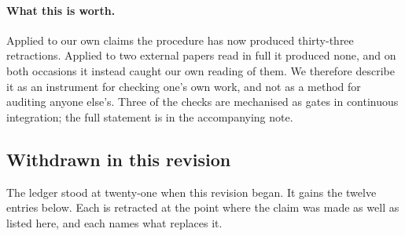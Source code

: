 \documentclass[11pt]{article}
\theoremstyle{definition}
\begin{document}
\paragraph{What this is worth.} Applied to our own claims the procedure has now
produced thirty-three retractions. Applied to two external papers read in full it
produced none, and on both occasions it instead caught our own reading of them.
We therefore describe it as an instrument for checking one's own work, and not as
a method for auditing anyone else's. Three of the checks are mechanised as gates
in continuous integration; the full statement is in the accompanying note.

\subsection{Withdrawn in this revision}
\label{sec:thisrevision}

The ledger stood at twenty-one when this revision began. It gains the twelve
entries below. Each is retracted at the point where the claim was made as well as
listed here, and each names what replaces it.
\end{document}
